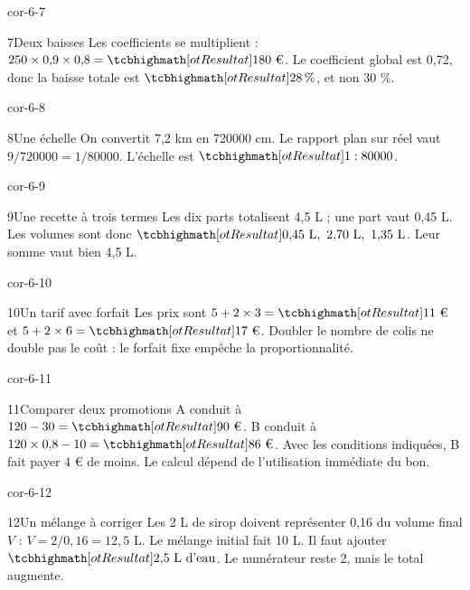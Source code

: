 \begin{blocLivre}{cor-6-7}\begin{corrige}{7}{Deux baisses}
Les coefficients se multiplient : $250\times0{,}9\times0{,}8=\res{180\text{ €}}$. Le coefficient global est 0,72, donc la baisse totale est $\res{28\,\%}$, et non 30 \%.
\end{corrige}\end{blocLivre}
\begin{blocLivre}{cor-6-8}\begin{corrige}{8}{Une échelle}
On convertit 7,2 km en 720000 cm. Le rapport plan sur réel vaut $9/720000=1/80000$. L’échelle est $\res{1:80000}$.
\end{corrige}\end{blocLivre}
\begin{blocLivre}{cor-6-9}\begin{corrige}{9}{Une recette à trois termes}
Les dix parts totalisent 4,5 L ; une part vaut 0,45 L. Les volumes sont donc $\res{0{,}45\text{ L},\ 2{,}70\text{ L},\ 1{,}35\text{ L}}$. Leur somme vaut bien 4,5 L.
\end{corrige}\end{blocLivre}
\begin{blocLivre}{cor-6-10}\begin{corrige}{10}{Un tarif avec forfait}
Les prix sont $5+2\times3=\res{11\text{ €}}$ et $5+2\times6=\res{17\text{ €}}$. Doubler le nombre de colis ne double pas le coût : le forfait fixe empêche la proportionnalité.
\end{corrige}\end{blocLivre}
\begin{blocLivre}{cor-6-11}\begin{corrige}{11}{Comparer deux promotions}
A conduit à $120-30=\res{90\text{ €}}$. B conduit à $120\times0{,}8-10=\res{86\text{ €}}$. Avec les conditions indiquées, B fait payer 4 € de moins. Le calcul dépend de l’utilisation immédiate du bon.
\end{corrige}\end{blocLivre}
\begin{blocLivre}{cor-6-12}\begin{corrige}{12}{Un mélange à corriger}
Les 2 L de sirop doivent représenter 0,16 du volume final $V$ : $V=2/0{,}16=12{,}5$ L. Le mélange initial fait 10 L. Il faut ajouter $\res{2{,}5\text{ L d’eau}}$. Le numérateur reste 2, mais le total augmente.
\end{corrige}\end{blocLivre}
